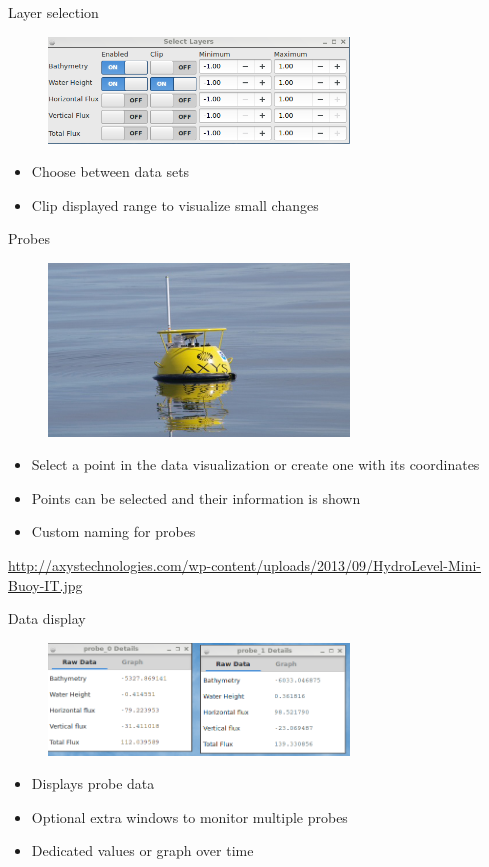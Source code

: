 \documentclass[shortpres,usenames,dvipsnames]{beamer}
\begin{document}
\begin{frame}[fragile]{Layer selection}
	\begin{figure}
		\includegraphics[clip, width=80mm]{img/layerselect.png}
	\end{figure}
	\begin{itemize}
		\item Choose between data sets
		\item Clip displayed range to visualize small changes
	\end{itemize}
\end{frame}

\begin{frame}[fragile]{Probes}
	\begin{figure}
		\includegraphics[clip, width=80mm]{img/Buoy.jpg}
	\end{figure}
	\begin{itemize}
		\item Select a point in the data visualization or create one with its coordinates
		\item Points can be selected and their information is shown
		\item Custom naming for probes
	\end{itemize}
	\vfill
	\flushleft
	{\fontsize{5}{5} \selectfont \url{http://axystechnologies.com/wp-content/uploads/2013/09/HydroLevel-Mini-Buoy-IT.jpg}}
\end{frame}

\begin{frame}[fragile]{Data display}
	\begin{figure}
		\includegraphics[clip, width=80mm]{img/datadisplay.png}
	\end{figure}
	\begin{itemize}
		\item Displays probe data
		\item Optional extra windows to monitor multiple probes
		\item Dedicated values or graph over time 
	\end{itemize}
\end{frame}
\end{document}
